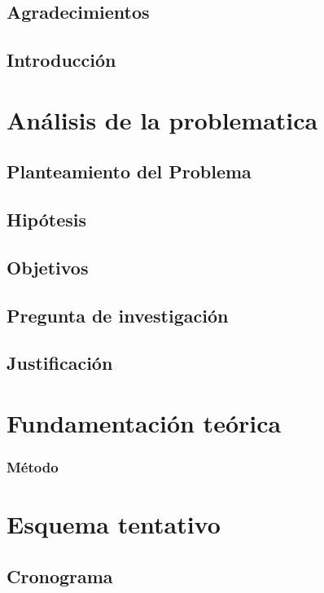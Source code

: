 \documentclass{book}
\begin{document}
\frontmatter

\pagestyle{empty}	

\section*{Agradecimientos}

\tableofcontents
\listoffigures
\listoftables
\mainmatter

\section{Introducción}
	
 
\chapter{Análisis de la problematica}

\section{Planteamiento del Problema}
	
	
\section{Hipótesis}
	

\section{Objetivos}
	
	
\section{Pregunta de investigación}
	
	
\section{Justificación}
	

 
	
\chapter{Fundamentación teórica}
	

\subsection{Método}
	





\chapter{Esquema tentativo}
	

\section{Cronograma}
	
\end{document}
